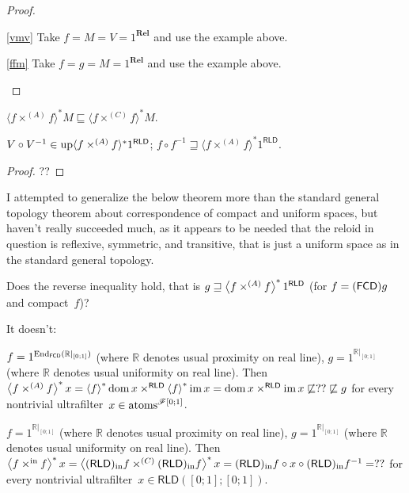 \begin{proof}
  ~
  \begin{widedisorder}
    \item[\ref{vmv}] Take $f=M=V=1^{\mathbf{Rel}}$ and use the example above.
    \item[\ref{ffm}] Take $f=g=M=1^{\mathbf{Rel}}$ and use the example above.
  \end{widedisorder}
\end{proof}

\begin{cor}
  $\langle f \times^{(A)} f \rangle^{\ast} M \sqsubseteq \langle f \times^{(C)} f
  \rangle^{\ast} M$.
\end{cor}

\begin{cor}
  $V \circ V^{- 1} \in \operatorname{up} \langle f \times^{(A)} f \rangle^{\ast} 1^{\mathsf{RLD}}$; $f
  \circ f^{- 1} \sqsupseteq \langle f \times^{(A)} f \rangle^{\ast} 1^{\mathsf{RLD}}$.
\end{cor}

\begin{proof}
  ??
\end{proof}

\begin{rem}
  I attempted to generalize the below theorem more than the standard general
  topology theorem about correspondence of compact and uniform spaces, but
  haven't really succeeded much, as it appears to be needed that the reloid in
  question is reflexive, symmetric, and transitive, that is just a uniform
  space as in the standard general topology.
\end{rem}

Does the reverse inequality hold, that is $g \sqsupseteq \left\langle f \times^{(A)} f\right\rangle ^{\ast} 1^{\mathsf{RLD}}$
(for $f=(\mathsf{FCD}) g$ and compact~$f$)?

\begin{grayed}
It doesn't:

\begin{example}
$f=1^{\operatorname{End}_{\mathsf{FCD}}(\mathbb{R}|_{[0;1]})}$ (where $\mathbb{R}$ denotes usual proximity on real line),
$g=1^{\mathbb{R}|_{[0;1]}}$ (where $\mathbb{R}$ denotes usual uniformity on real line).
Then $\left\langle f \times^{(A)} f\right\rangle ^{\ast} x = \left\langle f\right\rangle ^{\ast}\operatorname{dom} x\times^{\mathsf{RLD}}\left\langle f\right\rangle ^{\ast}\operatorname{im} x =
\operatorname{dom} x\times^{\mathsf{RLD}}\operatorname{im} x\not\sqsubseteq??\not\sqsubseteq g$
for every nontrivial ultrafilter~$x\in\operatorname{atoms}^{\mathscr{F}[0;1]}$.
\end{example}

\begin{example}
$f=1^{\mathbb{R}|_{[0;1]}}$ (where $\mathbb{R}$ denotes usual proximity on real line),
$g=1^{\mathbb{R}|_{[0;1]}}$ (where $\mathbb{R}$ denotes usual uniformity on real line).
Then $\left\langle f \times^{\mathrm{in}} f\right\rangle ^{\ast} x =
\left\langle (\mathsf{RLD})_{\mathrm{in}} f \times^{(C)} (\mathsf{RLD})_{\mathrm{in}} f\right\rangle ^{\ast} x =
(\mathsf{RLD})_{\mathrm{in}} f\circ x\circ(\mathsf{RLD})_{\mathrm{in}} f^{-1} =
??$
for every nontrivial ultrafilter~$x\in\mathsf{RLD}([0;1];[0;1])$.
\end{example}
\end{grayed}

